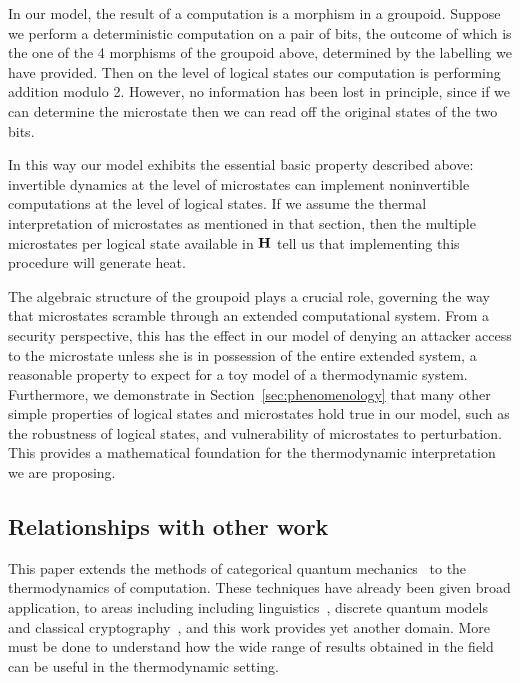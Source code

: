 \documentclass[a4paper,12pt]{article}
\theoremstyle{definition}
\newcommand\cat[1]{{\ensuremath{\bf #1}}}
\renewcommand{\-}[0]{\nobreakdash-\hspace{0pt}}
\begin{document}
In our model, the result of a computation is a morphism in a groupoid. Suppose we perform a deterministic computation on a pair of bits, the outcome of which is the one of the 4 morphisms of the groupoid above, determined by the labelling we have provided. Then  on the level of logical states our computation is performing addition modulo 2. However, no information has been lost in principle, since if we can determine the microstate then we can read off the original states of the two bits.

In this way our model exhibits the essential basic property described above: invertible dynamics at the level of microstates can implement noninvertible computations at the level of logical states. If we assume the thermal interpretation of microstates as mentioned in that section, then the multiple microstates per logical state available in \cat H tell us that implementing this procedure will generate heat.



The algebraic structure of the groupoid plays a crucial role, governing the way that microstates scramble through an extended computational system. From a security perspective, this has the effect in our model of denying an attacker access to the microstate unless she is in possession of the entire extended system, a reasonable property to expect for a toy model of a thermodynamic system. Furthermore, we demonstrate in Section~\ref{sec:phenomenology} that many other simple properties of logical states and microstates hold true in our model, such as the robustness of logical states, and vulnerability of microstates to perturbation. This provides a mathematical foundation for the thermodynamic interpretation we are proposing.

\subsection{Relationships with other work}
\label{sec:otherwork}

\noindent
This paper extends the methods of categorical quantum mechanics~\cite{ac04-csqp, ac08-cqm, cd11-iqo, sv13-bsnc, v12-hsqp} to the thermodynamics of computation. These techniques have already been given broad application, to areas including including linguistics~\cite{csc10-cdm}, discrete quantum models~\cite{ce08-tqc} and classical cryptography~\cite{sv13-bsnc}, and this work provides yet another domain.
More must be done to understand how the wide range of results obtained in the field can be useful in the thermodynamic setting.
\end{document}
